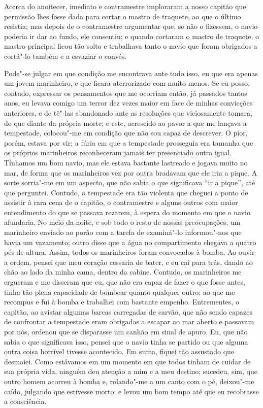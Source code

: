 Acerca do anoitecer, imediato e contramestre imploraram a nosso capitão
que permissão lhes fosse dada para cortar o mastro de traquete, ao que o
último resistia; mas depois de o contramestre argumentar que, se não o
fizessem, o navio poderia ir dar ao fundo, ele consentiu; e quando
cortaram o mastro de traquete, o mastro principal ficou tão solto e
trabalhava tanto o navio que foram obrigados a cortá"-lo também e a
esvaziar o convés.

Pode"-se julgar em que condição me encontrava ante tudo isso, eu que era
apenas um jovem marinheiro, e que ficara aterrorizado com muito menos.
Se eu posso, contudo, expressar os pensamentos que me ocorriam então, já
passados tantos anos, eu levava comigo um terror dez vezes maior em face
de minhas convicções anteriores, e de tê"-las abandonado ante as
resoluções que viciosamente tomara, do que diante da própria morte; e
este, acrescido ao pavor a que me lançava a tempestade, colocou"-me em
condição que não sou capaz de descrever. O pior, porém, estava por vir;
a fúria em que a tempestade prosseguia era tamanha que os próprios
marinheiros reconheceram jamais ter presenciado outra igual. Tínhamos um
bom navio, mas ele estava bastante lastreado e jogava muito no mar, de
forma que os marinheiros vez por outra bradavam que ele iria a pique. A
sorte sorria"-me em um aspecto, que não sabia o que significava ``ir a
pique'', até que perguntei. Contudo, a tempestade era tão violenta que
cheguei a ponto de assistir à rara cena de o capitão, o contramestre e
alguns outros com maior entendimento do que se passava rezarem, à espera
do momento em que o navio afundaria. No meio da noite, e sob todo o
resto de nossas preocupações, um marinheiro enviado ao porão com a
tarefa de examiná"-lo informou"-nos que havia um vazamento; outro disse
que a água no compartimento chegava a quatro pés de altura. Assim, todos
os marinheiros foram convocados à bomba. Ao ouvir a ordem, pensei que
meu coração cessaria de bater, e eu caí para trás, dando ao chão ao lado
da minha cama, dentro da cabine. Contudo, os marinheiros me ergueram e
me disseram que eu, que não era capaz de fazer o que fosse antes, tinha
tão plena capacidade de bombear quanto qualquer outro; ao que me
recompus e fui à bomba e trabalhei com bastante empenho. Entrementes, o
capitão, ao avistar algumas barcas carregadas de carvão, que não sendo
capazes de confrontar a tempestade eram obrigadas a escapar ao mar
aberto e passavam por nós, ordenou que se disparasse um canhão em sinal
de apuro. Eu, que não sabia o que significava isso, pensei que o navio
tinha se partido ou que alguma outra coisa horrível tivesse acontecido.
Em suma, fiquei tão assustado que desmaiei. Como estávamos em um momento
em que todos tinham de cuidar de sua própria vida, ninguém deu atenção a
mim e a meu destino; sucedeu, sim, que outro homem acorreu à bomba e,
rolando"-me a um canto com o pé, deixou"-me caído, julgando que estivesse
morto; e levou um bom tempo até que eu recobrasse a consciência.

